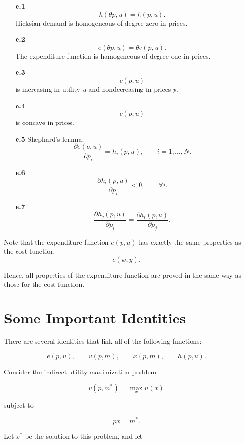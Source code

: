 \begin{enumerate}
    \item[\textbf{e.1}]
    \[
    h(\theta p,u)=h(p,u).
    \]
    Hicksian demand is homogeneous of degree zero in prices.

    \item[\textbf{e.2}]
    \[
    e(\theta p,u)=\theta e(p,u).
    \]
    The expenditure function is homogeneous of degree one in prices.

    \item[\textbf{e.3}]
    \[
    e(p,u)
    \]
    is increasing in utility \(u\) and nondecreasing in prices \(p\).

    \item[\textbf{e.4}]
    \[
    e(p,u)
    \]
    is concave in prices.

    \item[\textbf{e.5}] Shephard's lemma:
    \[
    \frac{\partial e(p,u)}{\partial p_i}
    =
    h_i(p,u),
    \qquad
    i=1,\dots,N.
    \]

    \item[\textbf{e.6}]
    \[
    \frac{\partial h_i(p,u)}{\partial p_i}
    <0,
    \qquad
    \forall i.
    \]

    \item[\textbf{e.7}]
    \[
    \frac{\partial h_j(p,u)}{\partial p_i}
    =
    \frac{\partial h_i(p,u)}{\partial p_j}.
    \]
\end{enumerate}

Note that the expenditure function \(e(p,u)\) has exactly the same properties as the cost function
\[
c(w,y).
\]

Hence, all properties of the expenditure function are proved in the same way as those for the cost function.




\section{Some Important Identities}

There are several identities that link all of the following functions:

\[
e(p,u), \qquad v(p,m), \qquad x(p,m), \qquad h(p,u).
\]

Consider the indirect utility maximization problem

\[
v(p,m^*)
=
\max_x u(x)
\]

subject to

\[
px=m^*.
\]

Let \(x^*\) be the solution to this problem, and let

